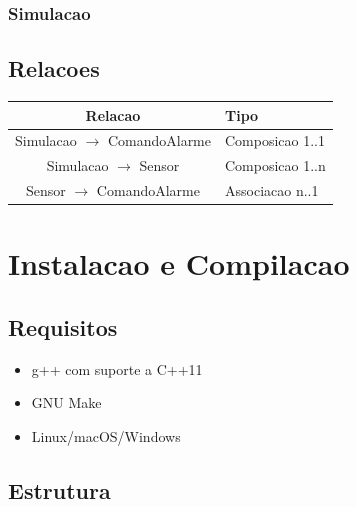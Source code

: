\documentclass[12pt,a4paper]{article}
\begin{document}
\subsubsection*{Simulacao}
\begin{center}
\end{center}

\subsection{Relacoes}

\begin{center}
\begin{tabular}{|c|l|}
\hline
\textbf{Relacao} & \textbf{Tipo} \\
\hline
Simulacao $\rightarrow$ ComandoAlarme & Composicao 1..1 \\
\hline
Simulacao $\rightarrow$ Sensor & Composicao 1..n \\
\hline
Sensor $\rightarrow$ ComandoAlarme & Associacao n..1 \\
\hline
\end{tabular}
\end{center}

\newpage

\section{Instalacao e Compilacao}

\subsection{Requisitos}

\begin{itemize}
    \item g++ com suporte a C++11
    \item GNU Make
    \item Linux/macOS/Windows
\end{itemize}

\subsection{Estrutura}
\end{document}
